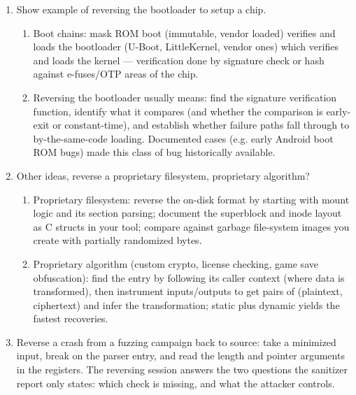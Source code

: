 \documentclass[12pt]{Training}
\begin{document}
\begin{enumerate}
\begin{enumerate}
        \item Using a debugger: break on the parse entry with a malformed client packet; watch parameter registers under the target's calling convention. This is the binary-side analogue of auditing a web server's header parser with source.
    \end{enumerate}
    \item Show example of reversing the bootloader to setup a chip.
    \begin{enumerate}
        \item Boot chains: mask ROM boot (immutable, vendor loaded) verifies and loads the bootloader (U-Boot, LittleKernel, vendor ones) which verifies and loads the kernel --- verification done by signature check or hash against e-fuses/OTP areas of the chip.
        \item Reversing the bootloader usually means: find the signature verification function, identify what it compares (and whether the comparison is early-exit or constant-time), and establish whether failure paths fall through to by-the-same-code loading. Documented cases (e.g. early Android boot ROM bugs) made this class of bug historically available.
    \end{enumerate}
    \item Other ideas, reverse a proprietary filesystem, proprietary algorithm?
    \begin{enumerate}
        \item Proprietary filesystem: reverse the on-disk format by starting with mount logic and its section parsing; document the superblock and inode layout as C structs in your tool; compare against garbage file-system images you create with partially randomized bytes.
        \item Proprietary algorithm (custom crypto, license checking, game save obfuscation): find the entry by following its caller context (where data is transformed), then instrument inputs/outputs to get pairs of (plaintext, ciphertext) and infer the transformation; static plus dynamic yields the fastest recoveries.
    \end{enumerate}
    \item Reverse a crash from a fuzzing campaign back to source: take a minimized input, break on the parser entry, and read the length and pointer arguments in the registers. The reversing session answers the two questions the sanitizer report only states: which check is missing, and what the attacker controls.
    \begin{enumerate}

\end{enumerate}
\end{enumerate}
\end{document}
